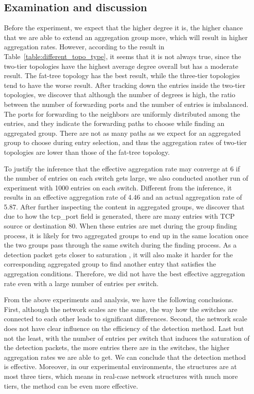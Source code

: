 \subsection{Examination and discussion}
\label{examination_and_discussion}

Before the experiment, we expect that the higher degree it is, the higher chance that we are able to extend an aggregation group more, which will result in higher aggregation rates. However, according to the result in Table~\ref{table:different_topo_type}, it seems that it is not always true, since the two-tier topologies have the highest average degree overall but has a moderate result. The fat-tree topology has the best result, while the three-tier topologies tend to have the worse result. After tracking down the entries inside the two-tier topologies, we discover that although the number of degrees is high, the ratio between the number of forwarding ports and the number of entries is imbalanced. The ports for forwarding to the neighbors are uniformly distributed among the entries, and they indicate the forwarding paths to choose while finding an aggregated group. There are not as many paths as we expect for an aggregated group to choose during entry selection, and thus the aggregation rates of two-tier topologies are lower than those of the fat-tree topology. 

To justify the inference that the effective aggregation rate may converge at 6 if the number of entries on each switch gets large, we also conducted another run of experiment with 1000 entries on each switch. Different from the inference, it results in an effective aggregation rate of 4.46 and an actual aggregation rate of 5.87. After further inspecting the content in aggregated groups, we discover that due to how the tcp\_port field is generated, there are many entries with TCP source or destination 80. When these entries are met during the group finding process, it is likely for two aggregated groups to end up in the same location once the two groups pass through the same switch during the finding process. As a detection packet gets closer to saturation , it will also make it harder for the corresponding aggregated group to find another entry that satisfies the aggregation conditions. Therefore, we did not have the best effective aggregation rate even with a large number of entries per switch. 

From the above experiments and analysis, we have the following conclusions. First, although the network scales are the same, the way how the switches are connected to each other leads to significant differences. Second, the network scale does not have clear influence on the efficiency of the detection method. Last but not the least, with the number of entries per switch that induces the saturation of the detection packets, the more entries there are in the switches, the higher aggregation rates we are able to get. We can conclude that the detection method is effective. Moreover, in our experimental environments, the structures are at most three tiers, which means in real-case network structures with much more tiers, the method can be even more effective. 